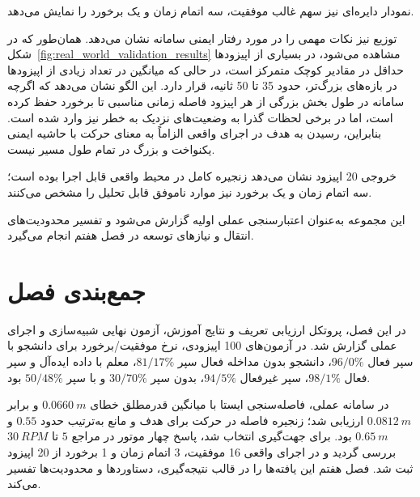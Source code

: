 نمودار دایره‌ای نیز سهم غالب موفقیت، سه اتمام زمان و یک برخورد را نمایش می‌دهد.

توزیع  نیز نکات مهمی را در مورد رفتار ایمنی سامانه نشان می‌دهد. همان‌طور که در شکل~\ref{fig:real_world_validation_results} مشاهده می‌شود، در بسیاری از اپیزودها حداقل  در مقادیر کوچک متمرکز است، در حالی که میانگین  در تعداد زیادی از اپیزودها در بازه‌های بزرگ‌تر، حدود 35 تا 50 ثانیه، قرار دارد. این الگو نشان می‌دهد که اگرچه سامانه در طول بخش بزرگی از هر اپیزود فاصله زمانی مناسبی تا برخورد حفظ کرده است، اما در برخی لحظات گذرا به وضعیت‌های نزدیک به خطر نیز وارد شده است. بنابراین، رسیدن به هدف در اجرای واقعی الزاماً به معنای حرکت با حاشیه ایمنی یکنواخت و بزرگ در تمام طول مسیر نیست.

خروجی 20 اپیزود نشان می‌دهد زنجیره کامل در محیط واقعی قابل اجرا بوده است؛ سه اتمام زمان و یک برخورد نیز موارد ناموفق قابل تحلیل را مشخص می‌کنند.

این مجموعه به‌عنوان اعتبارسنجی عملی اولیه گزارش می‌شود و تفسیر محدودیت‌های انتقال و نیازهای توسعه در فصل هفتم انجام می‌گیرد.

\section{جمع‌بندی فصل}
\label{sec:chapter6_summary}

در این فصل، پروتکل ارزیابی تعریف و نتایج آموزش، آزمون نهایی شبیه‌سازی و اجرای عملی گزارش شد. در آزمون‌های 100 اپیزودی، نرخ موفقیت/برخورد برای دانشجو با سپر فعال $96/0\%$، دانشجو بدون مداخله فعال سپر $81/17\%$، معلم با داده ایده‌آل و سپر فعال $98/1\%$، سپر غیرفعال $94/5\%$،  بدون سپر $30/70\%$ و  با سپر $50/48\%$ بود.

در سامانه عملی، فاصله‌سنجی ایستا با میانگین قدرمطلق خطای $0.0660~m$ و  برابر $0.0812~m$ ارزیابی شد؛  زنجیره فاصله در حرکت برای هدف و مانع به‌ترتیب حدود $0.55$ و $0.65~m$ بود.  برای جهت‌گیری انتخاب شد، پاسخ چهار موتور در مراجع $5$ تا $30~RPM$ بررسی گردید و در اجرای واقعی 16 موفقیت، 3 اتمام زمان و 1 برخورد از 20 اپیزود ثبت شد. فصل هفتم این یافته‌ها را در قالب نتیجه‌گیری، دستاوردها و محدودیت‌ها تفسیر می‌کند.
